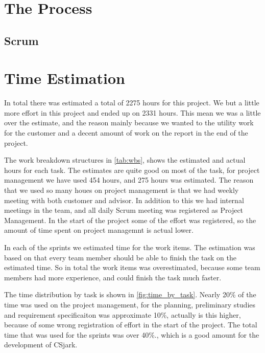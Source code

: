 \section{The Process}
\subsection{Scrum}


\section{Time Estimation}
In total there was estimated a total of 2275 hours for this project. We but a 
little more effort in this project and ended up on 2331 hours. This mean we 
was a little over the estimate, and the reason mainly because we wanted to the 
utility work for the customer and a decent amount of work on the report in the 
end of the project. 

The work breakdown structures in \autoref{tab:wbs}, shows the estimated and 
actual hours for each task. The estimates are quite good on most of the task, 
for project management we have used 454 hours, and 275 hours was estimated. 
The reason that we used so many houes on project management is that we had 
weekly meeting with both customer and advisor. In addition to this we had 
internal meetings in the team, and all daily Scrum meeting was registered as 
Project Management. In the start of the project some of the effort was 
registered, so the amount of time spent on project managemnt is actual lower.

In each of the sprints we estimated time for the work items. The estimation 
was based on that every team member should be able to finish the task on the 
estimated time. So in total the work items was overestimated, because some 
team members had more experience, and could finish the task much faster.

The time distribution by task is shown in \autoref{fig:time_by_task}. Nearly 
20\% of the time was used on the project management, for the planning, 
preliminary studies and requirement specificaiton was approximate 10\%, 
actually is this higher, because of some wrong registration of effort in the 
start of the project. The total time that was used for the sprints was over 
40\%., which is a good amount for the development of CSjark. 

